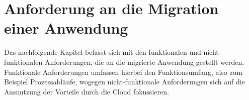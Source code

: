 \chapter{Anforderung an die Migration einer Anwendung}
\label{chap:anforderungen}

Das nachfolgende Kapitel befasst sich mit den funktionalen und nicht-funktionalen \mbox{Anforderungen}, die an die migrierte Anwendung gestellt werden. Funktionale Anforderungen umfassen hierbei den Funktionsumfang, also zum Beispiel Prozessabläufe, wogegen nicht-funktionale Anforderungen sich auf die Ausnutzung der Vorteile durch die Cloud fokussieren.


